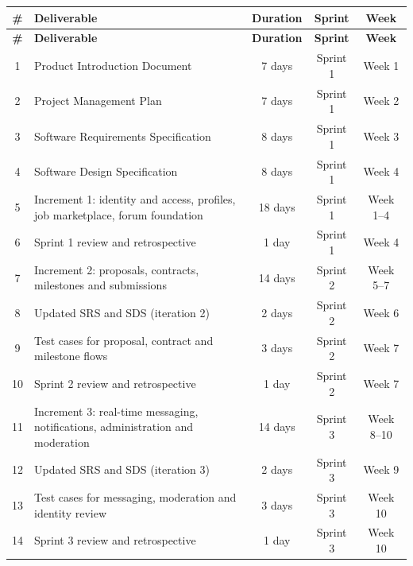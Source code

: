 \renewcommand{\arraystretch}{1.2}

\small

\begin{longtable}{|c|p{6.2cm}|c|c|c|}
\hline
\rowcolor{headerbg}
\textbf{\#} &
\textbf{Deliverable} &
\textbf{Duration} &
\textbf{Sprint} &
\textbf{Week}
\\ \hline
\endfirsthead

\hline
\rowcolor{headerbg}
\textbf{\#} &
\textbf{Deliverable} &
\textbf{Duration} &
\textbf{Sprint} &
\textbf{Week}
\\ \hline
\endhead

\hline
\endfoot
\hline
\endlastfoot

1 & Product Introduction Document & 7 days & Sprint 1 & Week 1 \\ \hline
2 & Project Management Plan & 7 days & Sprint 1 & Week 2 \\ \hline
3 & Software Requirements Specification & 8 days & Sprint 1 & Week 3 \\ \hline
4 & Software Design Specification & 8 days & Sprint 1 & Week 4 \\ \hline
5 & Increment 1: identity and access, profiles, job marketplace, forum foundation & 18 days & Sprint 1 & Week 1--4 \\ \hline
6 & Sprint 1 review and retrospective & 1 day & Sprint 1 & Week 4 \\ \hline

7 & Increment 2: proposals, contracts, milestones and submissions & 14 days & Sprint 2 & Week 5--7 \\ \hline
8 & Updated SRS and SDS (iteration 2) & 2 days & Sprint 2 & Week 6 \\ \hline
9 & Test cases for proposal, contract and milestone flows & 3 days & Sprint 2 & Week 7 \\ \hline
10 & Sprint 2 review and retrospective & 1 day & Sprint 2 & Week 7 \\ \hline

11 & Increment 3: real-time messaging, notifications, administration and moderation & 14 days & Sprint 3 & Week 8--10 \\ \hline
12 & Updated SRS and SDS (iteration 3) & 2 days & Sprint 3 & Week 9 \\ \hline
13 & Test cases for messaging, moderation and identity review & 3 days & Sprint 3 & Week 10 \\ \hline
14 & Sprint 3 review and retrospective & 1 day & Sprint 3 & Week 10 \\ \hline


\end{longtable}
